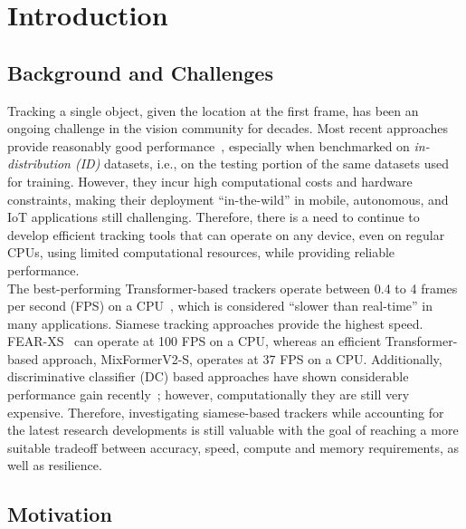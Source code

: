 
\chapter{Introduction} %

\label{Chapter1} %


\section{Background and Challenges}

Tracking a single object, given the location at the first frame, has been an ongoing challenge in the vision community for decades. Most recent approaches provide reasonably good performance~\cite{gao2022aiatrack,he2023target,yan2021learning,wei2023autoregressive,chen2023seqtrack}, especially when benchmarked on \emph{in-distribution (ID)} datasets, i.e., on the testing portion of the same datasets used for training. However, they incur high computational costs and hardware constraints, making their deployment ``in-the-wild'' in mobile, autonomous, and IoT applications still challenging. Therefore, there is a need to continue to develop efficient tracking tools that can operate on any device, even on regular CPUs, using limited computational resources, while providing reliable performance.  \\

The best-performing Transformer-based trackers operate between 0.4 to 4 frames per second (FPS) on a CPU~\cite{chen2023seqtrack,wu2023dropmae}, which is considered ``slower than real-time'' in many applications. Siamese tracking approaches provide the highest speed. FEAR-XS~\cite{borsuk2022fear} can operate at 100 FPS on a CPU, whereas an efficient Transformer-based approach, MixFormerV2-S\cite{cui2024mixformerv2}, operates at 37 FPS on a CPU.  Additionally, discriminative classiﬁer (DC) based approaches have shown considerable performance gain recently~\cite{bhat2020know,bhat2019learning,mayer2021learning}; however, computationally they are still very expensive. Therefore, investigating siamese-based trackers while accounting for the latest research developments is still valuable with the goal of reaching a more suitable tradeoff between accuracy, speed, compute and memory requirements, as well as resilience.

\section{Motivation}

